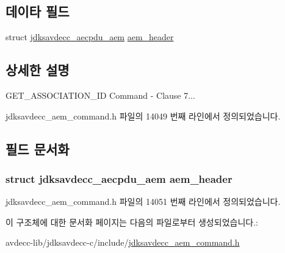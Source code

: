 \subsection*{데이타 필드}
\begin{DoxyCompactItemize}
\item 
struct \hyperlink{structjdksavdecc__aecpdu__aem}{jdksavdecc\+\_\+aecpdu\+\_\+aem} \hyperlink{structjdksavdecc__aem__command__get__association__id_ae1e77ccb75ff5021ad923221eab38294}{aem\+\_\+header}
\end{DoxyCompactItemize}


\subsection{상세한 설명}
G\+E\+T\+\_\+\+A\+S\+S\+O\+C\+I\+A\+T\+I\+O\+N\+\_\+\+ID Command -\/ Clause 7... 

jdksavdecc\+\_\+aem\+\_\+command.\+h 파일의 14049 번째 라인에서 정의되었습니다.



\subsection{필드 문서화}
\subsubsection[{\texorpdfstring{aem\+\_\+header}{aem_header}}]{\setlength{\rightskip}{0pt plus 5cm}struct {\bf jdksavdecc\+\_\+aecpdu\+\_\+aem} aem\+\_\+header}\hypertarget{structjdksavdecc__aem__command__get__association__id_ae1e77ccb75ff5021ad923221eab38294}{}\label{structjdksavdecc__aem__command__get__association__id_ae1e77ccb75ff5021ad923221eab38294}


jdksavdecc\+\_\+aem\+\_\+command.\+h 파일의 14051 번째 라인에서 정의되었습니다.



이 구조체에 대한 문서화 페이지는 다음의 파일로부터 생성되었습니다.\+:\begin{DoxyCompactItemize}
\item 
avdecc-\/lib/jdksavdecc-\/c/include/\hyperlink{jdksavdecc__aem__command_8h}{jdksavdecc\+\_\+aem\+\_\+command.\+h}\end{DoxyCompactItemize}
